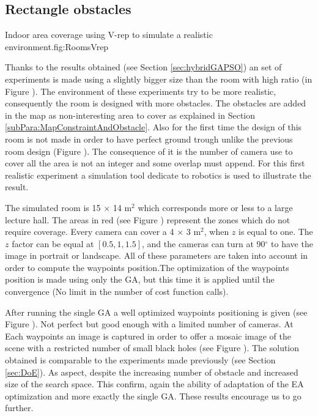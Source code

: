 	\subsection{Rectangle obstacles } \label{sec:expRectObstacle}
	\begin{mfigures}[!]{Indoor area coverage using V-rep to simulate a realistic environment.}{fig:RoomsVrep} \centering
{}
\hspace{1cm}
\hspace{1cm}

\tabsimuposeVrep
\end{mfigures}
	
	Thanks to the results obtained (see  Section \ref{sec:hybridGAPSO}) an  set of experiments is made using a slightly bigger size than the room with high ratio (in Figure ). The environment of these experiments try to be more realistic, consequently the room is designed with more obstacles. 
	The obstacles are added in the map as non-interesting area to cover as explained in Section \ref{subPara:MapConstraintAndObstacle}. Also for the first time the design of this room  is  not made in order to have perfect ground trough unlike the previous room design (Figure ). The consequence of it is the number of camera use to cover all the area is not an integer and some overlap must append.
	For this first realistic experiment a simulation tool dedicate to robotics is used to illustrate the result. 
	     
	The simulated room is 15 $\times$ 14 m$^2$ which corresponds more or less to a large lecture hall. The areas in red (see Figure ) represent the zones which do not require coverage. Every camera can cover a 4 $\times$ 3 m$^2$,  when $z$ is equal to one. The $z$ factor can be equal at $[0.5, 1, 1.5]$, and the cameras can turn  at 90$^{\circ}$ to have the image in portrait or landscape. All of these parameters are taken into account in order to compute the waypoints position.The optimization of the waypoints position is made using  only the GA, but this time it is applied until the convergence (No limit in the number of cost function calls). 
	
	 After running the single GA  a well optimized waypoints positioning is given (see Figure ). Not perfect but good enough with a limited number of cameras. At Each waypoints an image is captured in order to offer a  mosaic image of the scene with a restricted number of small black holes (see Figure ).
	  The solution obtained is comparable to the experiments made previously (see Section \ref{sec:DoE}). As aspect, despite the increasing number of obstacle and increased size of the search space. This confirm, again the ability of adaptation of the EA optimization and more exactly the single GA. These results encourage us to go  further. 

